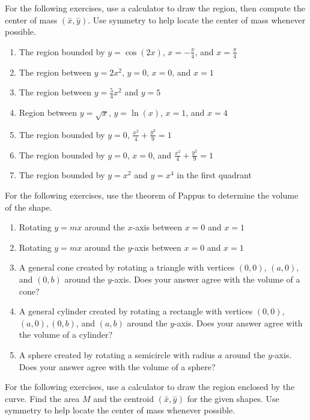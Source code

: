 \documentclass{exercises}
\begin{document}
For the following exercises, use a calculator to draw the region, then compute the center of mass $(\overset{-}{x},\overset{-}{y})$. Use symmetry to help locate the center of mass whenever possible.

\begin{enumerate}[resume]
\item \techrequired The region bounded by $y=\cos(2x)$, $x=-\frac{\pi}{4}$, and $x=\frac{\pi}{4}$
\item \techrequired The region between $y=2x^{2}$, $y=0$, $x=0$, and $x=1$
\item \techrequired The region between $y=\frac{5}{4}x^{2}$ and $y=5$
\item \techrequired Region between $y=\sqrt{x}$, $y=\ln(x)$, $x=1$, and $x=4$
\item \techrequired The region bounded by $y=0$, $\frac{x^{2}}{4}+\frac{y^{2}}{9}=1$
\item \techrequired The region bounded by $y=0$, $x=0$, and $\frac{x^{2}}{4}+\frac{y^{2}}{9}=1$
\item \techrequired The region bounded by $y=x^{2}$ and $y=x^{4}$ in the first quadrant
\end{enumerate}

For the following exercises, use the theorem of Pappus to determine the volume of the shape.

\begin{enumerate}[resume]
\item Rotating $y=mx$ around the $x$-axis between $x=0$ and $x=1$
\item Rotating $y=mx$ around the $y$-axis between $x=0$ and $x=1$
\item A general cone created by rotating a triangle with vertices $(0,0)$, $(a,0)$, and $(0,b)$ around the $y$-axis. Does your answer agree with the volume of a cone?
\item A general cylinder created by rotating a rectangle with vertices $(0,0)$, $(a,0),(0,b)$, and $(a,b)$ around the $y$-axis. Does your answer agree with the volume of a cylinder?
\item A sphere created by rotating a semicircle with radius $a$ around the $y$-axis. Does your answer agree with the volume of a sphere?
\end{enumerate}

For the following exercises, use a calculator to draw the region enclosed by the curve. Find the area $M$ and the centroid $(\overset{-}{x},\overset{-}{y})$ for the given shapes. Use symmetry to help locate the center of mass whenever possible.
\end{document}
